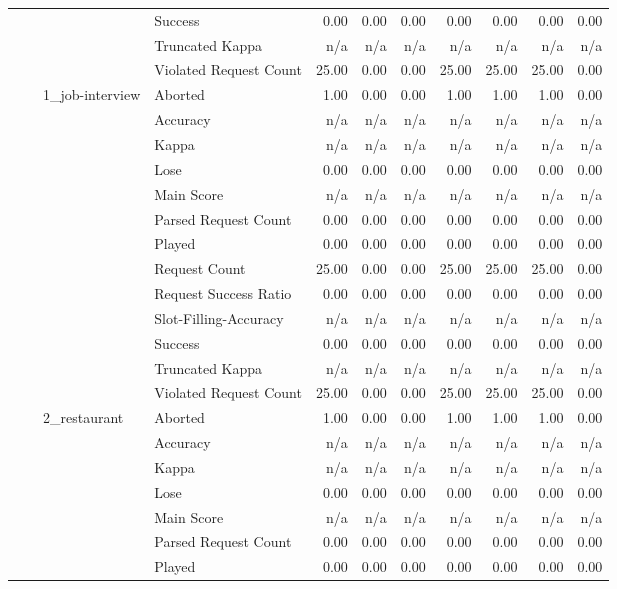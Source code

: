\begin{tabular}{llllrrrrrrr}
 &  &  & Success & 0.00 & 0.00 & 0.00 & 0.00 & 0.00 & 0.00 & 0.00 \\
 &  &  & Truncated Kappa & n/a & n/a & n/a & n/a & n/a & n/a & n/a \\
 &  &  & Violated Request Count & 25.00 & 0.00 & 0.00 & 25.00 & 25.00 & 25.00 & 0.00 \\
\cline{3-11}
 &  & \multirow[t]{13}{*}{1_job-interview} & Aborted & 1.00 & 0.00 & 0.00 & 1.00 & 1.00 & 1.00 & 0.00 \\
 &  &  & Accuracy & n/a & n/a & n/a & n/a & n/a & n/a & n/a \\
 &  &  & Kappa & n/a & n/a & n/a & n/a & n/a & n/a & n/a \\
 &  &  & Lose & 0.00 & 0.00 & 0.00 & 0.00 & 0.00 & 0.00 & 0.00 \\
 &  &  & Main Score & n/a & n/a & n/a & n/a & n/a & n/a & n/a \\
 &  &  & Parsed Request Count & 0.00 & 0.00 & 0.00 & 0.00 & 0.00 & 0.00 & 0.00 \\
 &  &  & Played & 0.00 & 0.00 & 0.00 & 0.00 & 0.00 & 0.00 & 0.00 \\
 &  &  & Request Count & 25.00 & 0.00 & 0.00 & 25.00 & 25.00 & 25.00 & 0.00 \\
 &  &  & Request Success Ratio & 0.00 & 0.00 & 0.00 & 0.00 & 0.00 & 0.00 & 0.00 \\
 &  &  & Slot-Filling-Accuracy & n/a & n/a & n/a & n/a & n/a & n/a & n/a \\
 &  &  & Success & 0.00 & 0.00 & 0.00 & 0.00 & 0.00 & 0.00 & 0.00 \\
 &  &  & Truncated Kappa & n/a & n/a & n/a & n/a & n/a & n/a & n/a \\
 &  &  & Violated Request Count & 25.00 & 0.00 & 0.00 & 25.00 & 25.00 & 25.00 & 0.00 \\
\cline{3-11}
 &  & \multirow[t]{13}{*}{2_restaurant} & Aborted & 1.00 & 0.00 & 0.00 & 1.00 & 1.00 & 1.00 & 0.00 \\
 &  &  & Accuracy & n/a & n/a & n/a & n/a & n/a & n/a & n/a \\
 &  &  & Kappa & n/a & n/a & n/a & n/a & n/a & n/a & n/a \\
 &  &  & Lose & 0.00 & 0.00 & 0.00 & 0.00 & 0.00 & 0.00 & 0.00 \\
 &  &  & Main Score & n/a & n/a & n/a & n/a & n/a & n/a & n/a \\
 &  &  & Parsed Request Count & 0.00 & 0.00 & 0.00 & 0.00 & 0.00 & 0.00 & 0.00 \\
 &  &  & Played & 0.00 & 0.00 & 0.00 & 0.00 & 0.00 & 0.00 & 0.00 \\

\end{tabular}

